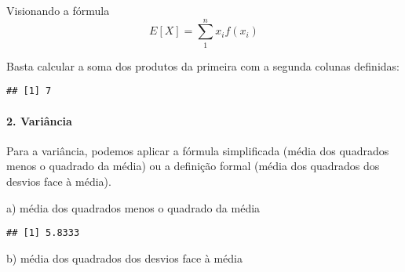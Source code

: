 \documentclass[
]{article}
\newenvironment{Shaded}{\begin{snugshade}}{\end{snugshade}}
\newcommand{\DecValTok}[1]{\textcolor[rgb]{0.00,0.00,0.81}{#1}}
\newcommand{\FunctionTok}[1]{\textcolor[rgb]{0.00,0.00,0.00}{#1}}
\newcommand{\NormalTok}[1]{#1}
\newcommand{\OtherTok}[1]{\textcolor[rgb]{0.56,0.35,0.01}{#1}}
\newcommand{\SpecialCharTok}[1]{\textcolor[rgb]{0.00,0.00,0.00}{#1}}
\begin{document}
Visionando a fórmula \[E[X]=\sum_{1}^{n} x_i f(x_i)\]

Basta calcular a soma dos produtos da primeira com a segunda colunas
definidas:

\begin{Shaded}
\end{Shaded}

\begin{verbatim}
## [1] 7
\end{verbatim}

\hypertarget{variuxe2ncia}{%
\paragraph{2. Variância}\label{variuxe2ncia}}

Para a variância, podemos aplicar a fórmula simplificada (média dos
quadrados menos o quadrado da média) ou a definição formal (média dos
quadrados dos desvios face à média).

a) média dos quadrados menos o quadrado da média

\begin{Shaded}
\end{Shaded}

\begin{verbatim}
## [1] 5.8333
\end{verbatim}

b) média dos quadrados dos desvios face à média

\begin{Shaded}
\end{Shaded}
\end{document}
